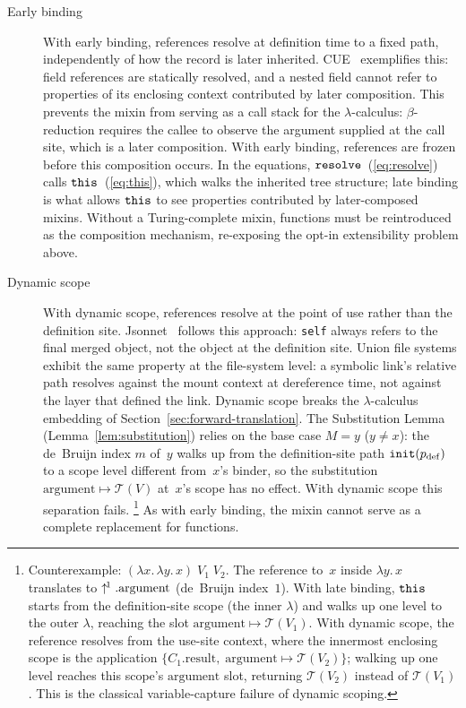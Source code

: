 \begin{description}
  \item[Early binding]
    With early binding, references resolve at definition time to a
    fixed path, independently of how the record is later inherited.
    CUE~\cite{cue2019} exemplifies this: field references are
    statically resolved, and a nested field cannot refer to
    properties of its enclosing context contributed by later
    composition.
    This prevents the mixin from serving as a call stack for the
    $\lambda$-calculus: $\beta$-reduction requires the callee to
    observe the argument supplied at the call site, which is a
    later composition.
    With early binding, references are frozen before this
    composition occurs.
    In the equations,
    $\mathtt{resolve}$~(\ref{eq:resolve}) calls
    $\mathtt{this}$~(\ref{eq:this}), which walks the inherited
    tree structure; late binding is what allows
    $\mathtt{this}$ to see properties contributed by later-composed
    mixins.
    Without a Turing-complete mixin, functions must be
    reintroduced as the composition mechanism, re-exposing
    the opt-in extensibility problem above.

  \item[Dynamic scope]
    With dynamic scope, references resolve at the point of use
    rather than the definition site.
    Jsonnet~\cite{jsonnet} follows this approach: \texttt{self}
    always refers to the final merged object, not the object at
    the definition site.
    Union file systems exhibit the same property at the
    file-system level: a symbolic link's relative path resolves
    against the mount context at dereference time, not against the
    layer that defined the link.
    Dynamic scope breaks the $\lambda$-calculus embedding
    of Section~\ref{sec:forward-translation}.
    The Substitution Lemma (Lemma~\ref{lem:substitution})
    relies on the base case $M = y$ ($y \neq x$):
    the de~Bruijn index $m$ of~$y$ walks up from the
    definition-site path $\mathtt{init}(p_{\mathrm{def}})$ to a scope
    level different from~$x$'s binder, so the substitution
    $\mathrm{argument} \mapsto \mathcal{T}(V)$ at~$x$'s scope
    has no effect.
    With dynamic scope this separation fails.%
    \footnote{
      Counterexample:
      $(\lambda x.\, \lambda y.\, x)\; V_1\; V_2$.
      The reference to~$x$ inside $\lambda y.\, x$ translates to
      $\uparrow^{\!1}.\mathrm{argument}$ (de~Bruijn index~$1$).
      With late binding, $\mathtt{this}$ starts from the definition-site
      scope (the inner $\lambda$) and walks up one level to the
      outer $\lambda$, reaching the slot
      $\mathrm{argument} \mapsto \mathcal{T}(V_1)$.
      With dynamic scope, the reference resolves from the
      use-site context, where the innermost enclosing scope is
      the application $\{C_1.\mathrm{result},\;
      \mathrm{argument} \mapsto \mathcal{T}(V_2)\}$;
      walking up one level reaches this scope's
      $\mathrm{argument}$ slot, returning $\mathcal{T}(V_2)$
      instead of $\mathcal{T}(V_1)$.
      This is the classical variable-capture failure of dynamic
      scoping.
    }
    As with early binding, the mixin cannot serve as a complete
    replacement for functions.


\end{description}

